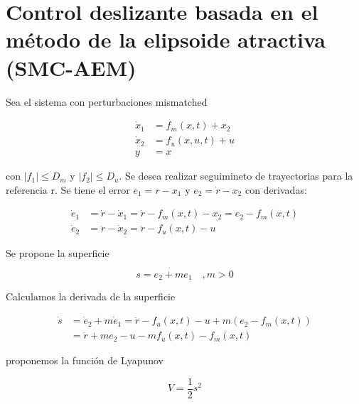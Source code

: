 \begin{flushright}
\end{flushright}

\section{Control deslizante basada en el método de la elipsoide atractiva (SMC-AEM)}

Sea el sistema con perturbaciones mismatched

\begin{equation*}
    \begin{aligned}
        \dot{x}_1 &= f_m(x,t) + x_2 \\
        \dot{x}_2 &= f_u(x, u, t) + u \\
        y &= x
    \end{aligned}
\end{equation*}

con \(|f_1|\leq D_m\) y \(|f_2|\leq D_u\). Se desea realizar seguimineto de trayectorias para la referencia r. Se tiene el error \(e_1=r-x_1\) y \(e_2=\dot{r}-x_2\) con derivadas:

\begin{equation*}
    \begin{aligned}
        \dot{e}_1 &= \dot{r}-\dot{x}_1 = \dot{r} - f_m(x,t) - x_2 = e_2 - f_m(x,t)\\
        \dot{e}_2 &= \ddot{r}-\dot{x}_2 = \ddot{r} - f_u(x, t) - u
    \end{aligned}
\end{equation*}

Se propone la superficie

\begin{equation*}
    s = e_2 + me_1 \quad, m>0
\end{equation*}

Calculamos la derivada de la superficie

\begin{equation*}
    \begin{aligned}
        \dot{s} &= \dot{e}_2 + m\dot{e}_1 = \ddot{r} - f_u(x, t) - u + m(e_2 - f_m(x,t))\\
        &= \ddot{r} + me_2 - u - mf_u(x,t) - f_m(x, t)
    \end{aligned}
\end{equation*}

proponemos la función de Lyapunov

\begin{equation*}
    V = \frac{1}{2}s^2
\end{equation*}

